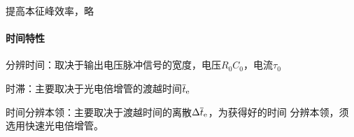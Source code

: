 提高本征峰效率，略
\paragraph{时间特性}
\begin{compactitem}
	\item 分辨时间：取决于输出电压脉冲信号的宽度，电压$R_0C_0$，电流$\tau_0$
	\item 时滞：主要取决于光电倍增管的渡越时间$\overline{t}_\mathrm e$
	\item 时间分辨本领：主要取决于渡越时间的离散$\Delta\overline{t}_\mathrm e$，为获得好的时间	分辨本领，须选用快速光电倍增管。
\end{compactitem}



